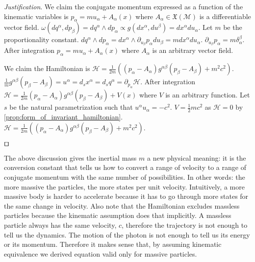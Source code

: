 \documentclass[smallextended]{svjour3}
\numberwithin{equation}{section}
\newenvironment{justification}{\emph{Justification}.}{\hfill\(\qed\)}
\theoremstyle{definition}
\newenvironment{justification}{\emph{Justification}.}{\qed}
\begin{document}
\begin{justification}
	We claim the conjugate momentum expressed as a function of the kinematic variables is $p_\alpha = m u_\alpha + A_\alpha(x)$ where $A_\alpha \in \mathfrak{X}(\mathcal{M})$ is a differentiable vector field. $\omega(dq^\alpha, dp_\beta) = dq^\alpha \wedge dp_\alpha \propto g(dx^\alpha, du^\beta) = dx^\alpha du_\alpha$. Let $m$ be the proportionality constant. $dq^\alpha \wedge dp_\alpha = dx^\alpha \wedge \partial_{u_\beta} p_\alpha du_\beta = m dx^\alpha du_\alpha$. $\partial_{u_\beta} p_\alpha = m \delta_\alpha^\beta$. After integration $p_\alpha = m u_\alpha + A_\alpha(x)$ where $A_\alpha$ is an arbitrary vector field.
	
	We claim the Hamiltonian is $\mathcal{H}=\frac{1}{2m}((p_\alpha-A_\alpha)g^{\alpha\beta}(p_\beta-A_\beta) + m^2 c^2)$.  $\frac{1}{m}g^{\alpha\beta}(p_\beta-A_\beta) = u^\alpha = d_s x^\alpha = d_s q^\alpha = \partial_{p_\alpha} \mathcal{H}$. After integration $\mathcal{H}=\frac{1}{2m}(p_\alpha-A_\alpha)g^{\alpha\beta}(p_\beta-A_\beta)+V(x)$ where $V$ is an arbitrary function. Let $s$ be the natural parametrization such that $u^\alpha u_\alpha = - c^2$. $V= \frac{1}{2}m c^2$ as $\mathcal{H}=0$ by \ref{prop:form_of_invariant_hamiltonian}. $\mathcal{H}=\frac{1}{2m}((p_\alpha-A_\alpha)g^{\alpha\beta}(p_\beta-A_\beta) + m^2 c^2)$.
	
\end{justification}

The above discussion gives the inertial mass $m$ a new physical meaning: it is the conversion constant that tells us how to convert a range of velocity to a range of conjugate momentum with the same number of possibilities. In other words: the more massive the particles, the more states per unit velocity. Intuitively, a more massive body is harder to accelerate because it has to go through more states for the same change in velocity. Also note that the Hamiltonian excludes massless particles because the kinematic assumption does that implicitly. A massless particle always has the same velocity, $c$, therefore the trajectory is not enough to tell us the dynamics. The motion of the photon is not enough to tell us its energy or its momentum. Therefore it makes sense that, by assuming kinematic equivalence we derived equation valid only for massive particles.
\end{document}
